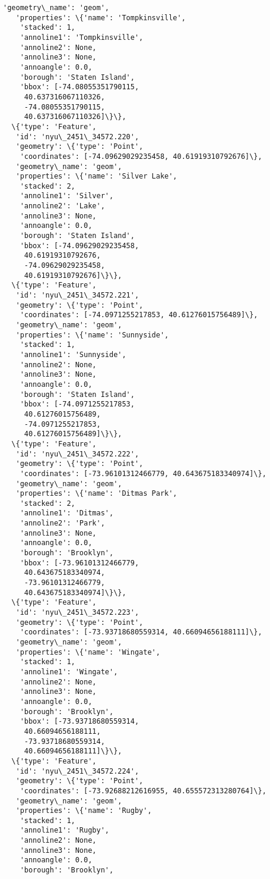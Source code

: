 \documentclass[11pt]{article}
\begin{document}
\begin{tcolorbox}[breakable, size=fbox, boxrule=.5pt, pad at break*=1mm, opacityfill=0]
\begin{Verbatim}[commandchars=\\\{\}]
   'geometry\_name': 'geom',
   'properties': \{'name': 'Tompkinsville',
    'stacked': 1,
    'annoline1': 'Tompkinsville',
    'annoline2': None,
    'annoline3': None,
    'annoangle': 0.0,
    'borough': 'Staten Island',
    'bbox': [-74.08055351790115,
     40.637316067110326,
     -74.08055351790115,
     40.637316067110326]\}\},
  \{'type': 'Feature',
   'id': 'nyu\_2451\_34572.220',
   'geometry': \{'type': 'Point',
    'coordinates': [-74.09629029235458, 40.61919310792676]\},
   'geometry\_name': 'geom',
   'properties': \{'name': 'Silver Lake',
    'stacked': 2,
    'annoline1': 'Silver',
    'annoline2': 'Lake',
    'annoline3': None,
    'annoangle': 0.0,
    'borough': 'Staten Island',
    'bbox': [-74.09629029235458,
     40.61919310792676,
     -74.09629029235458,
     40.61919310792676]\}\},
  \{'type': 'Feature',
   'id': 'nyu\_2451\_34572.221',
   'geometry': \{'type': 'Point',
    'coordinates': [-74.0971255217853, 40.61276015756489]\},
   'geometry\_name': 'geom',
   'properties': \{'name': 'Sunnyside',
    'stacked': 1,
    'annoline1': 'Sunnyside',
    'annoline2': None,
    'annoline3': None,
    'annoangle': 0.0,
    'borough': 'Staten Island',
    'bbox': [-74.0971255217853,
     40.61276015756489,
     -74.0971255217853,
     40.61276015756489]\}\},
  \{'type': 'Feature',
   'id': 'nyu\_2451\_34572.222',
   'geometry': \{'type': 'Point',
    'coordinates': [-73.96101312466779, 40.643675183340974]\},
   'geometry\_name': 'geom',
   'properties': \{'name': 'Ditmas Park',
    'stacked': 2,
    'annoline1': 'Ditmas',
    'annoline2': 'Park',
    'annoline3': None,
    'annoangle': 0.0,
    'borough': 'Brooklyn',
    'bbox': [-73.96101312466779,
     40.643675183340974,
     -73.96101312466779,
     40.643675183340974]\}\},
  \{'type': 'Feature',
   'id': 'nyu\_2451\_34572.223',
   'geometry': \{'type': 'Point',
    'coordinates': [-73.93718680559314, 40.66094656188111]\},
   'geometry\_name': 'geom',
   'properties': \{'name': 'Wingate',
    'stacked': 1,
    'annoline1': 'Wingate',
    'annoline2': None,
    'annoline3': None,
    'annoangle': 0.0,
    'borough': 'Brooklyn',
    'bbox': [-73.93718680559314,
     40.66094656188111,
     -73.93718680559314,
     40.66094656188111]\}\},
  \{'type': 'Feature',
   'id': 'nyu\_2451\_34572.224',
   'geometry': \{'type': 'Point',
    'coordinates': [-73.92688212616955, 40.655572313280764]\},
   'geometry\_name': 'geom',
   'properties': \{'name': 'Rugby',
    'stacked': 1,
    'annoline1': 'Rugby',
    'annoline2': None,
    'annoline3': None,
    'annoangle': 0.0,
    'borough': 'Brooklyn',

\end{Verbatim}
\end{tcolorbox}
\end{document}
